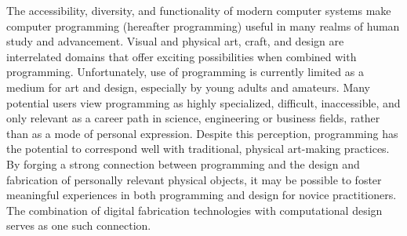 % 
% 
%
The accessibility, diversity, and functionality of modern computer systems make computer programming (hereafter programming) useful in many realms of human study and advancement. Visual and physical art, craft, and design are interrelated domains that offer exciting possibilities when combined with programming. Unfortunately, use of programming is currently limited as a medium for art and design, especially by young adults and amateurs. Many potential users view programming as highly specialized, difficult, inaccessible, and only relevant as a career path in science, engineering or business fields, rather than as a mode of personal expression. Despite this perception, programming has the potential to correspond well with traditional, physical art-making practices. By forging a strong connection between programming and the design and fabrication of personally relevant physical objects, it may be possible to foster meaningful experiences in both programming and design for novice practitioners. The combination of digital fabrication technologies with computational design serves as one such connection.
